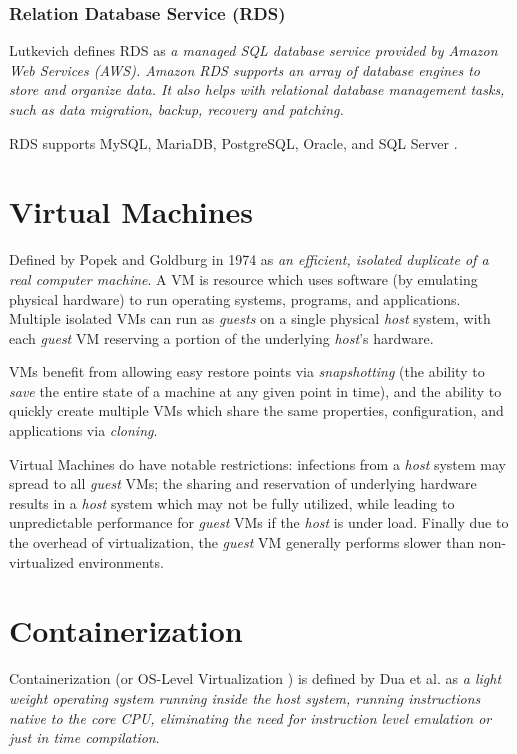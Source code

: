 \subsection{Relation Database Service (RDS)}
Lutkevich \cite{lutkevich_2021} defines RDS as \emph{a managed SQL database service provided by Amazon Web Services (AWS). Amazon RDS supports an array of database engines to store and organize data. 
It also helps with relational database management tasks, such as data migration, backup, recovery and patching.}

RDS supports MySQL, MariaDB, PostgreSQL, Oracle, and SQL Server \cite{beach2019relational}.

\chapter{Virtual Machines}
Defined by Popek and Goldburg in 1974 as \emph{an efficient, isolated duplicate of a real computer machine}\cite{popek_1974}. 
A VM is resource which uses software (by emulating physical hardware) to run operating systems, programs, and applications. 
Multiple isolated VMs can run as \textit{guests} on a single physical \textit{host} system, with each \textit{guest} VM reserving a portion of the underlying
\textit{host}'s hardware. 

VMs benefit from allowing easy restore points via \textit{snapshotting} (the ability to \textit{save} the entire state of a machine at any given point in time), 
and the ability to quickly create multiple VMs which share the same properties, configuration, and applications via \textit{cloning}\cite{n-able_2021}. 

Virtual Machines do have notable restrictions: infections from a \textit{host} system may spread to all \textit{guest} VMs;
the sharing and reservation of underlying hardware results in a \textit{host} system which may not be fully utilized, 
while leading to unpredictable performance for \textit{guest} VMs if the \textit{host} is under load. 
Finally due to the overhead of virtualization, the \textit{guest} VM generally performs slower than non-virtualized environments\cite{Martinovic}.

\chapter{Containerization}

Containerization (or OS-Level Virtualization \cite{10.5555/1571423}) is defined by Dua et al. as 
\emph{a light weight operating system running inside the host system, running instructions native to the core
CPU, eliminating the need for instruction level emulation or just in time compilation}\cite{6903537}.


